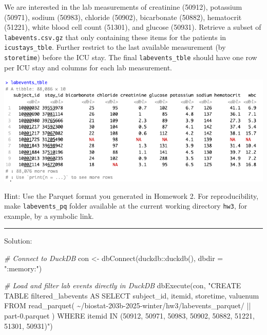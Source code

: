 \documentclass[
]{article}
\newenvironment{Shaded}{\begin{snugshade}}{\end{snugshade}}
\newcommand{\AttributeTok}[1]{\textcolor[rgb]{0.77,0.63,0.00}{#1}}
\newcommand{\CommentTok}[1]{\textcolor[rgb]{0.56,0.35,0.01}{\textit{#1}}}
\newcommand{\FunctionTok}[1]{\textcolor[rgb]{0.00,0.00,0.00}{#1}}
\newcommand{\NormalTok}[1]{\textcolor[rgb]{0.00,0.00,0.00}{#1}}
\newcommand{\OtherTok}[1]{\textcolor[rgb]{0.56,0.35,0.01}{#1}}
\newcommand{\SpecialCharTok}[1]{\textcolor[rgb]{0.00,0.00,0.00}{#1}}
\newcommand{\StringTok}[1]{\textcolor[rgb]{0.31,0.60,0.02}{#1}}
\begin{document}
We are interested in the lab measurements of creatinine (50912),
potassium (50971), sodium (50983), chloride (50902), bicarbonate
(50882), hematocrit (51221), white blood cell count (51301), and glucose
(50931). Retrieve a subset of \texttt{labevents.csv.gz} that only
containing these items for the patients in \texttt{icustays\_tble}.
Further restrict to the last available measurement (by
\texttt{storetime}) before the ICU stay. The final
\texttt{labevents\_tble} should have one row per ICU stay and columns
for each lab measurement.

\includegraphics{images/labevents_tble.png}

Hint: Use the Parquet format you generated in Homework 2. For
reproducibility, make \texttt{labevents\_pq} folder available at the
current working directory \texttt{hw3}, for example, by a symbolic link.

\begin{center}\rule{0.5\linewidth}{0.5pt}\end{center}

Solution:

\begin{Shaded}
\begin{Highlighting}[]
\CommentTok{\# Connect to DuckDB}
\NormalTok{con }\OtherTok{\textless{}{-}} \FunctionTok{dbConnect}\NormalTok{(duckdb}\SpecialCharTok{::}\FunctionTok{duckdb}\NormalTok{(), }\AttributeTok{dbdir =} \StringTok{":memory:"}\NormalTok{)}

\CommentTok{\# Load and filter lab events directly in DuckDB}
\FunctionTok{dbExecute}\NormalTok{(con, }\StringTok{"CREATE TABLE filtered\_labevents AS }
\StringTok{                SELECT subject\_id, itemid, storetime, valuenum}
\StringTok{                FROM read\_parquet(}
\StringTok{    \textquotesingle{}\textasciitilde{}/biostat{-}203b{-}2025{-}winter/hw3/labevents\_parquet/\textquotesingle{} || }
\StringTok{    \textquotesingle{}part{-}0.parquet\textquotesingle{}}
\StringTok{  )}
\StringTok{                WHERE itemid IN (50912, 50971, 50983, 50902, }
\StringTok{          50882, 51221, 51301, 50931)"}\NormalTok{)}
\end{Highlighting}
\end{Shaded}
\end{document}
